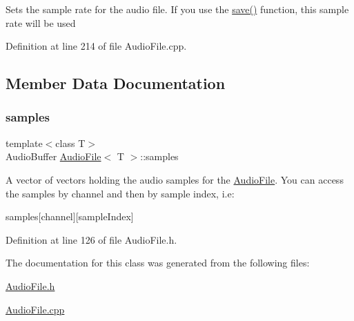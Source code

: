 Sets the sample rate for the audio file. If you use the \hyperlink{classAudioFile_a415239cad5b54b4fef4a210ab79911e3}{save()} function, this sample rate will be used 

Definition at line 214 of file Audio\+File.\+cpp.



\subsection{Member Data Documentation}
\mbox{\label{classAudioFile_af937119db095c5af870851050dcbeabb}} 
\subsubsection{\texorpdfstring{samples}{samples}}
{\footnotesize\ttfamily template$<$class T$>$ \\
Audio\+Buffer \hyperlink{classAudioFile}{Audio\+File}$<$ T $>$\+::samples}

A vector of vectors holding the audio samples for the \hyperlink{classAudioFile}{Audio\+File}. You can access the samples by channel and then by sample index, i.\+e\+: \begin{DoxyVerb} samples[channel][sampleIndex]\end{DoxyVerb}
 

Definition at line 126 of file Audio\+File.\+h.



The documentation for this class was generated from the following files\+:\begin{DoxyCompactItemize}
\item 
\hyperlink{AudioFile_8h}{Audio\+File.\+h}\item 
\hyperlink{AudioFile_8cpp}{Audio\+File.\+cpp}\end{DoxyCompactItemize}
